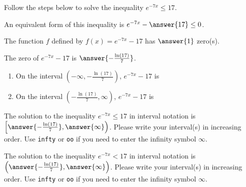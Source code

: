 \documentclass{ximera}
\author{Kenneth Berglund}
\begin{document}
Follow the steps below to solve the inequality $e^{-7x} \le 17$.
\begin{exercise}
An equivalent form of this inequality is $e^{-7x} - \answer{17} \le 0$. 

\begin{exercise}
The function $f$ defined by $f(x) = e^{-7x} - 17$ has $\answer{1}$ zero(s).

\begin{exercise}
The zero of $e^{-7x} - 17$ is $\answer{-\frac{\ln(17)}{7}}$.

\begin{exercise}
\begin{enumerate}
\item On the interval $\left(-\infty, -\frac{\ln(17)}{7}\right)$, $e^{-7x} - 17$ is 
\begin{multipleChoice}  
\end{multipleChoice} 

\item On the interval $\left(-\frac{\ln(17)}{7}, \infty\right)$, $e^{-7x} - 17$ is 
\begin{multipleChoice}  
\end{multipleChoice} 


\end{enumerate}

\begin{exercise}
The solution to the inequality $e^{-7x} \le 17$ in interval notation is $\left[\answer{-\frac{\ln(17)}{7}}, \answer{\infty}\right)$. Please write your interval(s) in increasing order. Use \verb+infty+ or \verb+oo+ if you need to enter the infinity symbol $\infty$.
\end{exercise}

\begin{exercise}
The solution to the inequality $e^{-7x} < 17$ in interval notation is $\left(\answer{-\frac{\ln(17)}{7}}, \answer{\infty}\right)$. Please write your interval(s) in increasing order. Use \verb+infty+ or \verb+oo+ if you need to enter the infinity symbol $\infty$.
\end{exercise}

\end{exercise}
\end{exercise}
\end{exercise}

\end{exercise}
\end{document}
